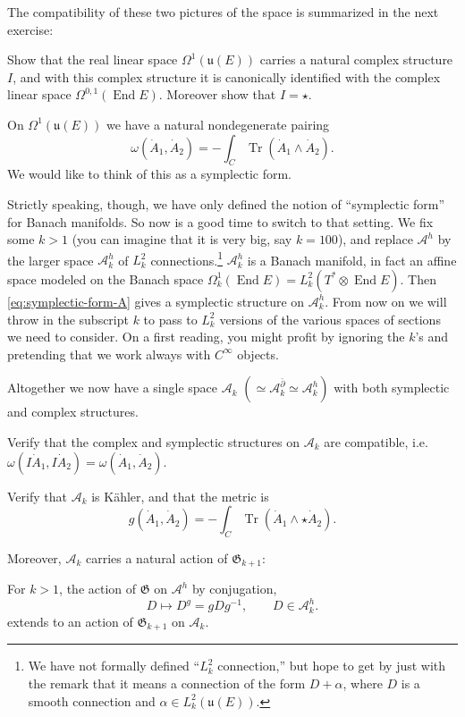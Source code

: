 \documentclass[12pt,letterpaper,reqno]{article}
\numberwithin{equation}{section}
\newcommand{\fu}{{\mathfrak u}}
\newcommand{\fG}{{\mathfrak G}}
\newcommand{\cA}{\ensuremath{\mathcal A}}
\newcommand{\kahler}{K\"ahler\xspace}
\DeclareMathOperator{\Tr}{Tr}
\DeclareMathOperator{\End}{End}
\begin{document}
The compatibility of these two pictures of the space
is summarized in the next exercise:

\begin{exercise} Show that the real linear space
$\Omega^{1}(\fu(E))$ carries a natural complex structure $I$,
and with this complex structure it is canonically identified
with the complex linear space $\Omega^{0,1}(\End E)$.
Moreover show that $I = \star$.
\end{exercise}

On $\Omega^{1}(\fu(E))$ we have a natural nondegenerate pairing
\begin{equation} \label{eq:symplectic-form-A}
  \omega(\dot{A}_1,\dot{A}_2) = -\int_C \Tr(\dot{A}_1 \wedge \dot{A}_2).
\end{equation}
We would like to think of this as a symplectic form.

Strictly speaking, though, we have only defined the notion
of ``symplectic form'' for Banach manifolds.
So now is a good time to switch to that setting.
We fix some $k > 1$ (you can imagine that it is very big,
say $k = 100$), and replace $\cA^h$ by the larger space $\cA^h_k$
of $L^2_k$ connections.\footnote{We have not formally defined
``$L^2_k$ connection,'' but hope to get by just with the remark
that it means a connection of the form $D + \alpha$,
where $D$ is a smooth connection and $\alpha \in L^2_k(\fu(E))$.}
$\cA^h_k$ is a Banach manifold,
in fact an affine space modeled on the Banach space
$\Omega^1_k(\End E) = L^2_k(T^* \otimes \End E)$.
Then \eqref{eq:symplectic-form-A} gives a symplectic
structure on $\cA^h_k$.
From now on we will throw in the subscript $k$ to pass
to $L^2_k$ versions of the various spaces of sections
we need to consider. On a first reading, you might profit
by ignoring the $k$'s and pretending that we work always
with $C^\infty$ objects.

Altogether we now have a single space $\cA_k$ $(\simeq \cA^{\bar\partial}_k \simeq \cA^h_k)$ with both symplectic and
complex structures.
\begin{exercise} Verify that the complex and symplectic structures
on $\cA_k$ are compatible, i.e. $\omega(I \dot{A}_1, I \dot{A}_2) = \omega(\dot{A}_1,\dot{A}_2)$.
\end{exercise}

\begin{exercise} Verify that $\cA_k$ is \kahler, and that the metric is
\begin{equation}
  g(\dot{A}_1,\dot{A}_2) = - \int_C \Tr(\dot{A}_1 \wedge \star \dot{A}_2).
\end{equation}
\end{exercise}
Moreover, $\cA_k$ carries a natural action of $\fG_{k+1}$:
\begin{prop} For $k>1$, the action of $\fG$ on $\cA^h$ by conjugation,
\begin{equation}
  D \mapsto D^g = g D g^{-1}, \qquad D \in \cA^h_k.
\end{equation}
extends to an action of $\fG_{k+1}$ on $\cA_k$.
\end{prop}
\end{document}

